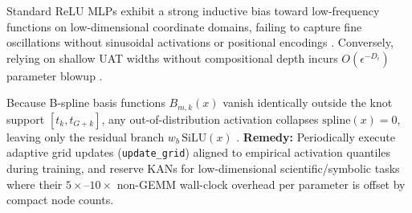 \documentclass[../../../../master.tex]{subfiles}
\begin{document}
\begin{pitfall}
Standard ReLU MLPs exhibit a strong inductive bias toward low-frequency functions on low-dimensional coordinate domains, failing to capture fine oscillations without sinusoidal activations or positional encodings . Conversely, relying on shallow UAT widths without compositional depth incurs $O(\epsilon^{-D_i})$ parameter blowup .
\end{pitfall}

\begin{pitfall}
Because B-spline basis functions $B_{m,k}(x)$ vanish identically outside the knot support $[t_k, t_{G+k}]$, any out-of-distribution activation collapses $\mathrm{spline}(x) = 0$, leaving only the residual branch $w_b\,\mathrm{SiLU}(x)$ .
\textbf{Remedy:} Periodically execute adaptive grid updates (\texttt{update\_grid}) aligned to empirical activation quantiles during training, and reserve KANs for low-dimensional scientific/symbolic tasks where their $5\times$--$10\times$ non-GEMM wall-clock overhead per parameter is offset by compact node counts.
\end{pitfall}
\end{document}
